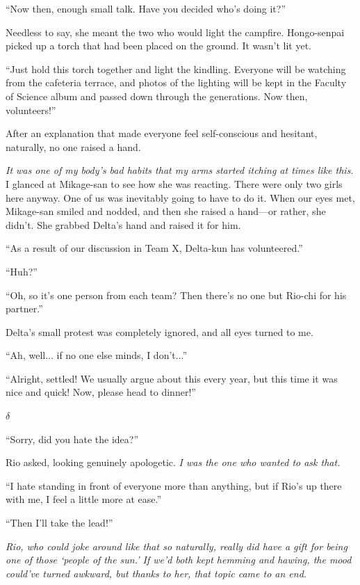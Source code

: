 \documentclass[
    a4paper,
    12pt,
    twoside,
    openany,
    UTF8,
    fontset=windows
]{ctexbook}
\begin{document}
``Now then, enough small talk. Have you decided who's doing it?''

Needless to say, she meant the two who would light the campfire. Hongo-senpai picked up a torch that had been placed on the ground. It wasn't lit yet.

``Just hold this torch together and light the kindling. Everyone will be watching from the cafeteria terrace, and photos of the lighting will be kept in the Faculty of Science album and passed down through the generations. Now then, volunteers!''

After an explanation that made everyone feel self-conscious and hesitant, naturally, no one raised a hand.

\textit{It was one of my body's bad habits that my arms started itching at times like this.} I glanced at Mikage-san to see how she was reacting. There were only two girls here anyway. One of us was inevitably going to have to do it. When our eyes met, Mikage-san smiled and nodded, and then she raised a hand---or rather, she didn't. She grabbed Delta's hand and raised it for him.

``As a result of our discussion in Team X, Delta-kun has volunteered.''

``Huh?''

``Oh, so it's one person from each team? Then there's no one but Rio-chi for his partner.''

Delta's small protest was completely ignored, and all eyes turned to me.

``Ah, well... if no one else minds, I don't...''

``Alright, settled! We usually argue about this every year, but this time it was nice and quick! Now, please head to dinner!''

$\delta$

``Sorry, did you hate the idea?''

Rio asked, looking genuinely apologetic. \textit{I was the one who wanted to ask that.}

``I hate standing in front of everyone more than anything, but if Rio's up there with me, I feel a little more at ease.''

``Then I'll take the lead!''

\textit{Rio, who could joke around like that so naturally, really did have a gift for being one of those `people of the sun.' If we'd both kept hemming and hawing, the mood could've turned awkward, but thanks to her, that topic came to an end.}
\end{document}
